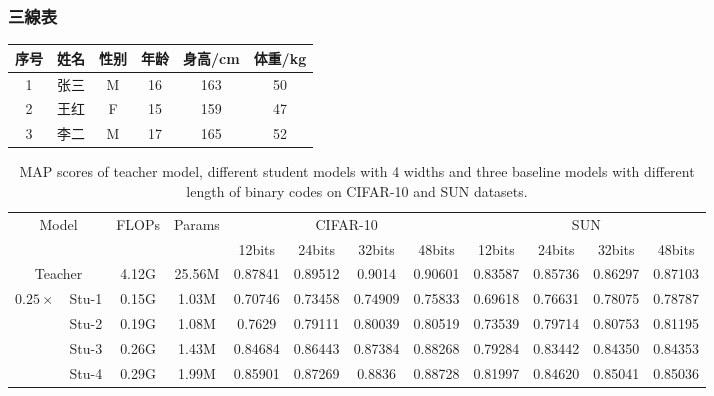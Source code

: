 \subsubsection*{三線表}
\begin{tabular}{cccccc}
  \toprule
  序号 & 姓名 & 性别 & 年龄 & 身高/cm & 体重/kg \\
  \midrule
  1 & 张三 & M & 16 & 163 & 50 \\
  
  \cmidrule(lr){2-3}
  \cmidrule(lr){4-5}
  \cmidrule(lr){6-6}\morecmidrules\cmidrule(lr){6-6}

  2 & 王红 & F & 15 & 159 & 47 \\
  3 & 李二 & M & 17 & 165 & 52 \\
  \bottomrule
\end{tabular}

\begin{table}[t]
  \centering
  \caption{MAP scores of teacher model, different student models with 4 widths and three baseline models with different length of binary codes on CIFAR-10 and SUN datasets.}
  \label{table1}
  \begin{tabular}{|c|c|c|c|c|c|c|c|c|c|c|c|}
  \hline
  \multicolumn{2}{|c|}{\multirow{2}{*}{Model}} &\multirow{2}{*}{FLOPs}&\multirow{2}{*}{Params} & \multicolumn{4}{c|}{CIFAR-10}&\multicolumn{4}{c|}{SUN}\\
  \cline{5-12}
  
  \multicolumn{2}{|c|}{} & & & 12bits & 24bits & 32bits & 48bits & 12bits & 24bits & 32bits & 48bits \\
  \hline
  
  \multicolumn{2}{|c|}{Teacher} &4.12G	&25.56M	&0.87841	&0.89512	&0.9014	&0.90601	&0.83587	&0.85736	&0.86297	&0.87103\\ 
  \hline
  
  \multirow{4}{*}{$0.25\times$} & Stu-1 & 0.15G & 1.03M &
  0.70746 & 0.73458 &	0.74909 &	0.75833 &	0.69618 &	0.76631 &	0.78075 &	0.78787 \\
  \cline{2-12}
  
  \multirow{4}{*}{} & Stu-2 &0.19G	&1.08M	&0.7629	&0.79111	&0.80039	&0.80519	&0.73539	&0.79714	&0.80753	&0.81195\\
  \cline{2-12}
  
  \multirow{4}{*}{} & Stu-3 &0.26G	&1.43M	&0.84684	&0.86443	&0.87384	&0.88268	&0.79284	&0.83442	&0.84350	&0.84353\\
  \cline{2-12}
  
  \multirow{4}{*}{} & Stu-4 & 0.29G	&1.99M	&0.85901	&0.87269	&0.8836	&0.88728	&0.81997	&0.84620	&0.85041	&0.85036\\
  \hline
  \end{tabular}
  \label{table_MAP}
  \end{table}



